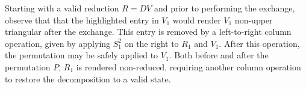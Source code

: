 \documentclass[sn-mathphys]{sn-jnl}
\begin{document}
Starting with a valid reduction $R = DV$ and prior to performing the exchange, observe that that the highlighted entry in $V_1$ would render $V_1$ non-upper triangular after the exchange. This entry is removed by a left-to-right column operation, given by applying  $S_1^{2}$ on the right to $R_1$ and $V_1$. After this operation, the permutation may be safely applied to $V_1$. Both before and after the permutation $P$, $R_1$ is rendered non-reduced, requiring another column operation to restore the decomposition to a valid state.
\end{document}
